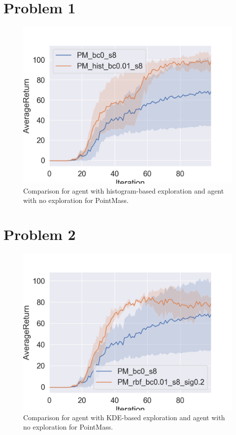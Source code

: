 \documentclass[12pt]{article}
\begin{document}
\pagebreak

\section{Problem 1}
\begin{figure}[!h]
\centering
\includegraphics[width=5in]{1.png}
\caption{Comparison for agent with histogram-based exploration
and agent with no exploration for PointMass.}
\end{figure}

\newpage

\section{Problem 2}
\begin{figure}[!h]
\centering
\includegraphics[width=5in]{2.png}
\caption{Comparison for agent with KDE-based exploration and agent with no exploration for PointMass.}
\end{figure}
\end{document}
